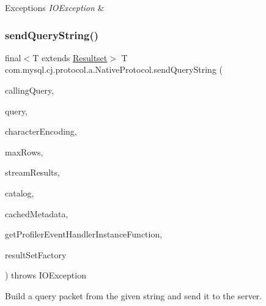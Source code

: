 \begin{DoxyExceptions}{Exceptions}
{\em I\+O\+Exception} & \\
\hline
\end{DoxyExceptions}
\mbox{\label{classcom_1_1mysql_1_1cj_1_1protocol_1_1a_1_1_native_protocol_a30e77ec54f66714f55e8f1c0872b8cfe}} 
\subsubsection{\texorpdfstring{send\+Query\+String()}{sendQueryString()}}
{\footnotesize\ttfamily final$<$T extends \mbox{\hyperlink{interfacecom_1_1mysql_1_1cj_1_1protocol_1_1_resultset}{Resultset}}$>$ T com.\+mysql.\+cj.\+protocol.\+a.\+Native\+Protocol.\+send\+Query\+String (\begin{DoxyParamCaption}\item[{\mbox{\hyperlink{interfacecom_1_1mysql_1_1cj_1_1_query}{Query}}}]{calling\+Query,  }\item[{String}]{query,  }\item[{String}]{character\+Encoding,  }\item[{int}]{max\+Rows,  }\item[{boolean}]{stream\+Results,  }\item[{String}]{catalog,  }\item[{\mbox{\hyperlink{interfacecom_1_1mysql_1_1cj_1_1protocol_1_1_column_definition}{Column\+Definition}}}]{cached\+Metadata,  }\item[{Get\+Profiler\+Event\+Handler\+Instance\+Function}]{get\+Profiler\+Event\+Handler\+Instance\+Function,  }\item[{\mbox{\hyperlink{interfacecom_1_1mysql_1_1cj_1_1protocol_1_1_protocol_entity_factory}{Protocol\+Entity\+Factory}}$<$ T, \mbox{\hyperlink{classcom_1_1mysql_1_1cj_1_1protocol_1_1a_1_1_native_packet_payload}{Native\+Packet\+Payload}} $>$}]{result\+Set\+Factory }\end{DoxyParamCaption}) throws I\+O\+Exception}

Build a query packet from the given string and send it to the server.


